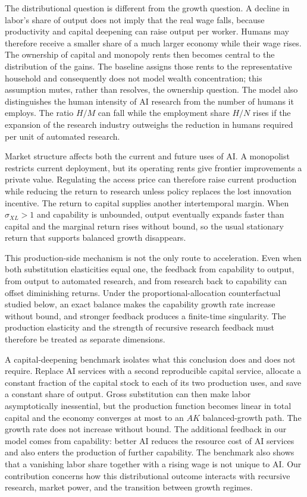 The distributional question is different from the growth question. A decline in
labor's share of output does not imply that the real wage falls, because productivity
and capital deepening can raise output per worker. Humans may therefore receive a
smaller share of a much larger economy while their wage rises. The ownership of
capital and monopoly rents then becomes central to the distribution of the gains.
The baseline assigns those rents to the representative household and consequently
does not model wealth concentration; this assumption mutes, rather than resolves,
the ownership question. The model also distinguishes the human intensity of AI
research from the number of humans it employs. The ratio $H/M$ can fall while the
employment share $H/N$ rises if the expansion of the research industry outweighs
the reduction in humans required per unit of automated research.

Market structure affects both the current and future uses of AI. A monopolist
restricts current deployment, but its operating rents give frontier improvements a
private value. Regulating the access price can therefore raise current production
while reducing the return to research unless policy replaces the lost innovation
incentive. The return to capital supplies another intertemporal margin. When
$\sigma_{XL}>1$ and capability is unbounded, output eventually expands faster than
capital and the marginal return rises without bound, so the usual stationary return
that supports balanced growth disappears.

This production-side mechanism is not the only route to acceleration. Even when
both substitution elasticities equal one, the feedback from capability to output,
from output to automated research, and from research back to capability can offset
diminishing returns. Under the proportional-allocation counterfactual studied below,
an exact balance makes the capability growth rate increase without bound, and
stronger feedback produces a finite-time singularity. The production elasticity and
the strength of recursive research feedback must therefore be treated as separate
dimensions.

A capital-deepening benchmark isolates what this conclusion does and does not require.
Replace AI services with a second reproducible capital service, allocate a constant
fraction of the capital stock to each of its two production uses, and save a constant
share of output. Gross substitution can then make labor asymptotically inessential,
but the production function becomes linear in total capital and the economy converges
at most to an $AK$ balanced-growth path. The growth rate does not increase without
bound. The additional feedback in our model comes from capability: better AI reduces
the resource cost of AI services and also enters the production of further capability.
The benchmark also shows that a vanishing labor share together with a rising wage is
not unique to AI. Our contribution concerns how this distributional outcome interacts
with recursive research, market power, and the transition between growth regimes.

